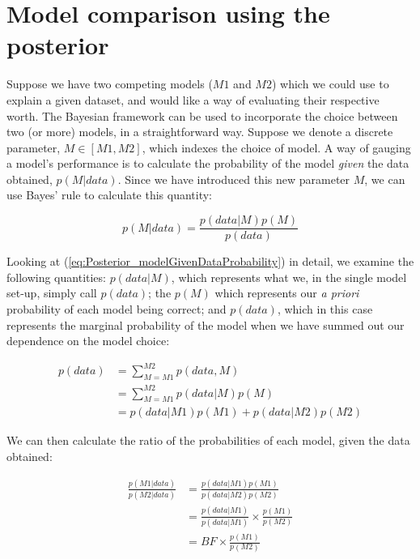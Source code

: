 \documentclass[11pt,fullpage]{book}
\begin{document}
\section{Model comparison using the posterior}
Suppose we have two competing models ($M1$ and $M2$) which we could use to explain a given dataset, and would like a way of evaluating their respective worth. The Bayesian framework can be used to incorporate the choice between two (or more) models, in a straightforward way. Suppose we denote a discrete parameter, $M\in[M1,M2]$, which indexes the choice of model. A way of gauging a model's performance is to calculate the probability of the model \textit{given} the data obtained, $p(M|data)$. Since we have introduced this new parameter $M$, we can use Bayes' rule to calculate this quantity:

\begin{equation}\label{eq:Posterior_modelGivenDataProbability}
p(M|data) = \frac{p(data|M) p(M)}{p(data)}
\end{equation}

Looking at (\ref{eq:Posterior_modelGivenDataProbability}) in detail, we examine the following quantities: $p(data|M)$, which represents what we, in the single model set-up, simply call $p(data)$; the $p(M)$ which represents our \textit{a priori} probability of each model being correct; and $p(data)$, which in this case represents the marginal probability of the model when we have summed out our dependence on the model choice:

\begin{equation}
\begin{align}
p(data) &= \sum\limits_{M=M1}^{M2} p(data,M)\\
&= \sum\limits_{M=M1}^{M2} p(data|M) p(M)\\
&= p(data|M1) p(M1) + p(data|M2) p(M2)
\end{align}
\end{equation}

We can then calculate the ratio of the probabilities of each model, given the data obtained:

\begin{equation}\label{eq:Posterior_modelComparisonFull}
\begin{align}
\frac{p(M1|data)}{p(M2|data)} &= \frac{p(data|M1) p(M1)}{p(data|M2) p(M2)}\\
&= \frac{p(data|M1)}{p(data|M1)} \times \frac{p(M1)}{p(M2)}\\
&= BF \times \frac{p(M1)}{p(M2)}
\end{align}
\end{equation}
\end{document}
